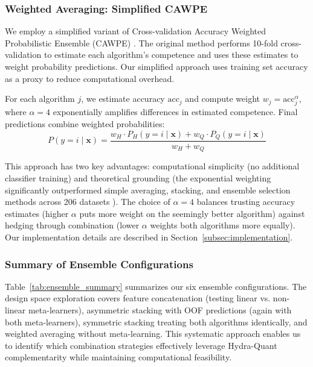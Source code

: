 \documentclass[pdflatex,sn-basic]{sn-jnl}           %
\theoremstyle{thmstyleone}%
\theoremstyle{thmstyletwo}%
\theoremstyle{thmstylethree}%
\begin{document}
\subsubsection{Weighted Averaging: Simplified CAWPE}

We employ a simplified variant of Cross-validation Accuracy Weighted Probabilistic Ensemble (CAWPE) \citep{cawpe}. The original method performs 10-fold cross-validation to estimate each algorithm's competence and uses these estimates to weight probability predictions. Our simplified approach uses training set accuracy as a proxy to reduce computational overhead.

For each algorithm $j$, we estimate accuracy $\text{acc}_j$ and compute weight $w_j = \text{acc}_j^\alpha$, where $\alpha=4$ exponentially amplifies differences in estimated competence. Final predictions combine weighted probabilities:
\begin{equation}
P(y=i \mid \mathbf{x}) = \frac{w_H \cdot P_H(y=i \mid \mathbf{x}) + w_Q \cdot P_Q(y=i \mid \mathbf{x})}{w_H + w_Q}
\end{equation}

This approach has two key advantages: computational simplicity (no additional classifier training) and theoretical grounding (the exponential weighting significantly outperformed simple averaging, stacking, and ensemble selection methods across 206 datasets \citep{cawpe}). The choice of $\alpha=4$ balances trusting accuracy estimates (higher $\alpha$ puts more weight on the seemingly better algorithm) against hedging through combination (lower $\alpha$ weights both algorithms more equally). Our implementation details are described in Section~\ref{subsec:implementation}.

\subsubsection{Summary of Ensemble Configurations}

Table~\ref{tab:ensemble_summary} summarizes our six ensemble configurations. The design space exploration covers feature concatenation (testing linear vs. non-linear meta-learners), asymmetric stacking with OOF predictions (again with both meta-learners), symmetric stacking treating both algorithms identically, and weighted averaging without meta-learning. This systematic approach enables us to identify which combination strategies effectively leverage Hydra-Quant complementarity while maintaining computational feasibility.
\end{document}
